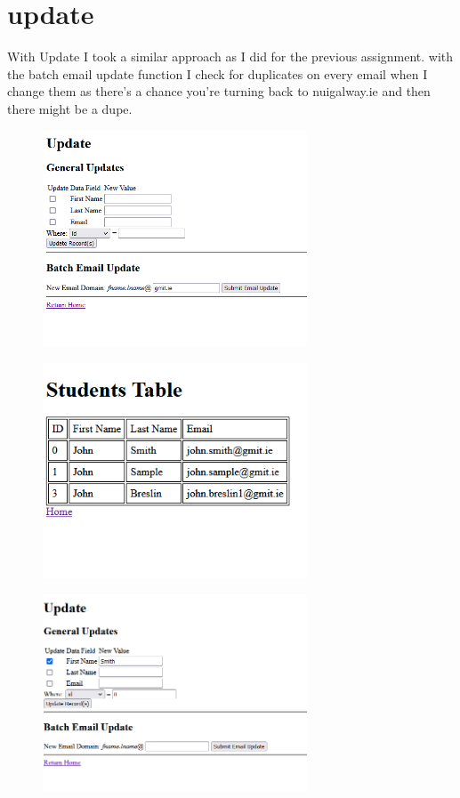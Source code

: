 \documentclass{article}
\begin{document}
	\section{update}
	With Update I  took a similar approach as I did for the previous assignment. with the batch email update function I check for duplicates on every email when I change them as there's a chance you're turning back to nuigalway.ie and then there might be a dupe.
	
		\begin{figure}[h!]
			\centering
			\includegraphics[width=0.7\textwidth]{8.png}
		\end{figure}
		
		\begin{figure}[h!]
			\centering
			\includegraphics[width=0.7\textwidth]{9.png}
		\end{figure}
		
		\begin{figure}[h!]
			\centering
			\includegraphics[width=0.7\textwidth]{10.png}
		\end{figure}
		
\end{document}
